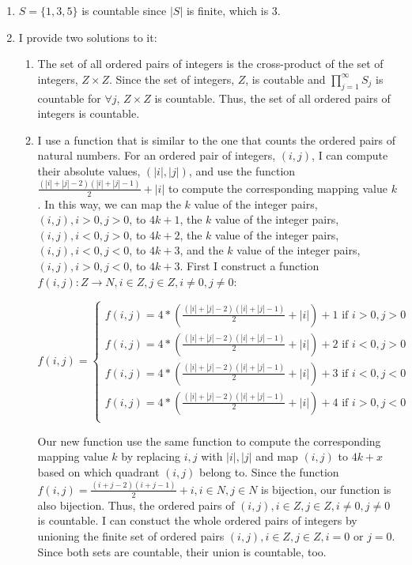 \documentclass{article}%
\begin{document}
\begin{enumerate}
\begin{enumerate}
		\item $S= \{1,3,5\}$ is countable since $|S|$ is finite, which is 3.
		
		\item 
		I provide two solutions to it:
			
\begin{enumerate}
  \item The set of all ordered pairs of integers is the cross-product of the set of integers, $Z \times Z$. Since the set of integers, $Z$, is coutable and $\prod_{j=1}^{\infty}S_{j}$ is countable for $\forall j$, $Z \times Z$ is countable. Thus, the set of all ordered pairs of integers is countable.
	\item I use a function that is similar to the one that counts the ordered pairs of natural numbers. For an ordered pair of integers, $(i,j)$, I can compute their absolute values, $(|i|,|j|)$, and use the function $\frac{(|i|+|j|-2)(|i|+|j|-1)}{2} + |i|$ to compute the corresponding mapping value $k$. In this way, we can map the $k$ value of the integer pairs, $(i,j), i > 0, j > 0$, to $4k + 1$, the $k$ value of the integer pairs, $(i,j), i < 0, j > 0$, to $4k + 2$, the $k$ value of the integer pairs, $(i,j), i < 0, j < 0$, to $4k + 3$, and the $k$ value of the integer pairs, $(i,j), i > 0, j < 0$, to $4k + 3$. First I construct a function $f(i,j): Z \rightarrow N, i \in Z, j \in Z, i \neq 0, j \neq 0$:
		
\begin{equation*}
f(i,j) = \left\{
\begin{array}{rl}
f(i,j) = 4 * \left(  \frac{(|i|+|j|-2)(|i|+|j|-1)}{2} + |i|\right) + 1 \text{  if } i > 0, j > 0\\
f(i,j) = 4 * \left(  \frac{(|i|+|j|-2)(|i|+|j|-1)}{2} + |i|\right) + 2 \text{  if } i < 0, j > 0\\
f(i,j) = 4 * \left(  \frac{(|i|+|j|-2)(|i|+|j|-1)}{2} + |i|\right) + 3 \text{  if } i < 0, j < 0\\
f(i,j) = 4 * \left(  \frac{(|i|+|j|-2)(|i|+|j|-1)}{2} + |i|\right) + 4 \text{  if } i > 0, j < 0\\
\end{array} \right.
\end{equation*}	

	Our new function use the same function to compute the corresponding mapping value $k$ by replacing $i,j$ with $|i|,|j|$ and map $(i,j)$ to $4k+x$ based on which quadrant $(i,j)$ belong to. Since the function $f(i,j) = \frac{(i+j-2)(i+j-1)}{2} + i, i \in N, j \in N$ is bijection, our function is also bijection. Thus, the ordered pairs of $(i,j),i \in Z, j \in Z, i \neq 0, j \neq 0$ is countable. I can constuct the whole ordered pairs of integers by unioning the finite set of ordered pairs $(i,j),i \in Z, j \in Z, i = 0 \text{ or } j = 0$. Since both sets are countable, their union is countable, too. 
\end{enumerate}
		

\end{enumerate}
\end{enumerate}
\end{document}
